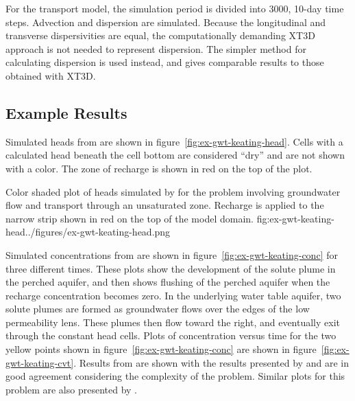 For the transport model, the simulation period is divided into 3000, 10-day time steps.  Advection and dispersion are simulated.  Because the longitudinal and transverse dispersivities are equal, the computationally demanding XT3D approach is not needed to represent dispersion.  The simpler method for calculating dispersion is used instead, and gives comparable results to those obtained with XT3D.  



\subsection{Example Results}

Simulated heads from \mf are shown in figure~\ref{fig:ex-gwt-keating-head}.  Cells with a calculated head beneath the cell bottom are considered ``dry'' and are not shown with a color.   The zone of recharge is shown in red on the top of the plot.  

\begin{StandardFigure}{
                                     Color shaded plot of heads simulated by \mf for the \cite{keating2009stable} problem involving groundwater flow and transport through an unsaturated zone.  Recharge is applied to the narrow strip shown in red on the top of the model domain.
                                     }{fig:ex-gwt-keating-head}{../figures/ex-gwt-keating-head.png}
\end{StandardFigure}                                 

Simulated concentrations from \mf are shown in figure~\ref{fig:ex-gwt-keating-conc} for three different times.  These plots show the development of the solute plume in the perched aquifer, and then shows flushing of the perched aquifer when the recharge concentration becomes zero.  In the underlying water table aquifer, two solute plumes are formed as groundwater flows over the edges of the low permeability lens.  These plumes then flow toward the right, and eventually exit through the constant head cells.  Plots of concentration versus time for the two yellow points shown in figure~\ref{fig:ex-gwt-keating-conc} are shown in figure~\ref{fig:ex-gwt-keating-cvt}.  Results from \mf are shown with the results presented by \cite{keating2009stable} and are in good agreement considering the complexity of the problem.  Similar plots for this problem are also presented by \cite{mt3dusgs}.

